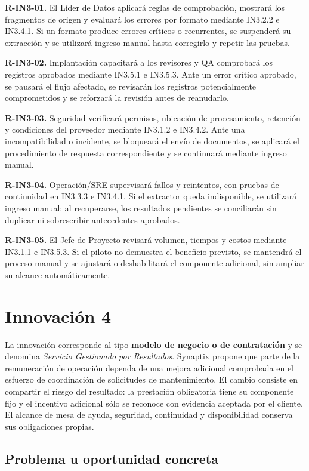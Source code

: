 \textbf{R-IN3-01.}
El Líder de Datos aplicará reglas de comprobación, mostrará
los fragmentos de origen y evaluará los errores por formato
mediante IN3.2.2 e IN3.4.1. Si un formato produce errores
críticos o recurrentes, se suspenderá su extracción y se
utilizará ingreso manual hasta corregirlo y repetir las pruebas.

\textbf{R-IN3-02.}
Implantación capacitará a los revisores y QA comprobará
los registros aprobados mediante IN3.5.1 e IN3.5.3.
Ante un error crítico aprobado, se pausará el flujo afectado,
se revisarán los registros potencialmente comprometidos
y se reforzará la revisión antes de reanudarlo.

\textbf{R-IN3-03.}
Seguridad verificará permisos, ubicación de procesamiento,
retención y condiciones del proveedor mediante IN3.1.2
e IN3.4.2. Ante una incompatibilidad o incidente, se bloqueará
el envío de documentos, se aplicará el procedimiento de
respuesta correspondiente y se continuará mediante ingreso manual.

\textbf{R-IN3-04.}
Operación/SRE supervisará fallos y reintentos, con pruebas
de continuidad en IN3.3.3 e IN3.4.1. Si el extractor queda
indisponible, se utilizará ingreso manual; al recuperarse,
los resultados pendientes se conciliarán sin duplicar
ni sobrescribir antecedentes aprobados.

\textbf{R-IN3-05.}
El Jefe de Proyecto revisará volumen, tiempos y costos
mediante IN3.1.1 e IN3.5.3. Si el piloto no demuestra
el beneficio previsto, se mantendrá el proceso manual
y se ajustará o deshabilitará el componente adicional,
sin ampliar su alcance automáticamente.
\newpage


\section{Innovación 4}

La innovación corresponde al tipo \textbf{modelo de negocio o de contratación} y se denomina \textit{Servicio Gestionado por Resultados}. Synaptix propone que parte de la remuneración de operación dependa de una mejora adicional comprobada en el esfuerzo de coordinación de solicitudes de mantenimiento. El cambio consiste en compartir el riesgo del resultado: la prestación obligatoria tiene su componente fijo y el incentivo adicional sólo se reconoce con evidencia aceptada por el cliente. El alcance de mesa de ayuda, seguridad, continuidad y disponibilidad conserva sus obligaciones propias.

\subsection{Problema u oportunidad concreta}

